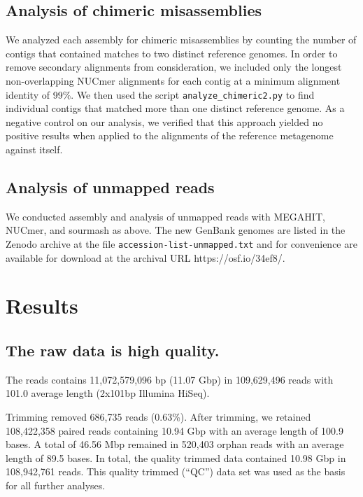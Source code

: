 \documentclass[11pt]{article}
\begin{document}

\subsection*{Analysis of chimeric misassemblies}


We analyzed each assembly for chimeric misassemblies by counting the
number of contigs that contained matches to two distinct reference
genomes.  In order to remove secondary alignments from consideration,
we included only the longest non-overlapping NUCmer
alignments for each contig at a minimum alignment identity of 99\%.
We then used the script {\tt analyze\_chimeric2.py} to find individual
contigs that matched more than one distinct reference genome.  As a
negative control on our analysis, we verified that this approach
yielded no positive results when applied to the alignments of the
reference metagenome against itself.


\subsection*{Analysis of unmapped reads}

We conducted assembly and analysis of unmapped reads with MEGAHIT,
NUCmer, and sourmash as above.  The new GenBank genomes are listed in
the Zenodo archive at the file {\tt accession-list-unmapped.txt} and
for convenience are available for download at the archival URL
https://osf.io/34ef8/.

\section*{Results}

\subsection*{The raw data is high quality.}

The reads contains 11,072,579,096 bp (11.07 Gbp) in 109,629,496 reads
with 101.0 average length (2x101bp Illumina HiSeq).

Trimming removed 686,735 reads (0.63\%).  After trimming, we retained
108,422,358 paired reads containing 10.94 Gbp with an average length of
100.9 bases. A total of 46.56 Mbp remained in 520,403 orphan reads with
an average length of 89.5 bases. In total, the quality trimmed data
contained 10.98 Gbp in 108,942,761 reads.  This quality trimmed (``QC'')
data set was used as the basis for all further analyses.
\end{document}

